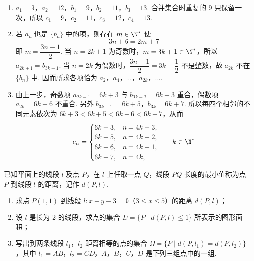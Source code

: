 \begin{solution}
\begin{enumerate}
\item \(a_1=9\)，\(a_2=12\)，\(b_1=9\)，\(b_2=11\)，\(b_3=13\). 合并集合时重复的 \(9\) 只保留一次，所以 \(c_1=9\)，\(c_2=11\)，\(c_3=12\)，\(c_4=13\).
\item 若 \(a_n\) 也是 \(\{b_n\}\) 中的项，则存在 \(m\in\N^*\) 使
\[
3n+6=2m+7
\]
即 \(m=\dfrac{3n-1}{2}\). 当 \(n=2k+1\) 为奇数时，\(m=3k+1\in\N^*\)，所以 \(a_{2k+1}=b_{3k+1}\). 当 \(n=2k\) 为偶数时，\(\dfrac{3n-1}{2}=3k-\dfrac12\) 不是整数，故 \(a_{2k}\) 不在 \(\{b_n\}\) 中. 因而所求各项恰为 \(a_2\)，\(a_4\)，\(\ldots\)，\(a_{2k}\)，\(\ldots\).
\item 由上一步，奇数项 \(a_{2k-1}=6k+3\) 与 \(b_{3k-2}=6k+3\) 重合，偶数项 \(a_{2k}=6k+6\) 不重合. 另外
\(b_{3k-1}=6k+5\)，\(b_{3k}=6k+7\).
所以每四个相邻的不同元素依次为 \(6k+3<6k+5<6k+6<6k+7\)，从而
\[
c_n=\begin{cases}
6k+3,&n=4k-3,\\
6k+5,&n=4k-2,\\
6k+6,&n=4k-1,\\
6k+7,&n=4k,
\end{cases}\qquad k\in\N^*
\]
\end{enumerate}
\end{solution}

\begin{problem}
已知平面上的线段 \(l\) 及点 \(P\)，在 \(l\) 上任取一点 \(Q\)，线段 \(PQ\) 长度的最小值称为点 \(P\) 到线段 \(l\) 的距离，记作 \(d(P, l)\).

\begin{enumerate}
\item 求点 \(P(1,1)\) 到线段 \(l: x - y - 3 = 0\)（\(3 \leqslant x \leqslant 5\)）的距离 \(d(P, l)\)；
\item 设 \(l\) 是长为 2 的线段，求点的集合 \(D = \{P \mid d(P, l) \leqslant 1\}\) 所表示的图形面积；
\item 写出到两条线段 \(l_1\)，\(l_2\) 距离相等的点的集合 \(\Omega = \{P \mid d(P, l_1) = d(P, l_2)\}\)，其中 \(l_1 = AB\)，\(l_2 = CD\)，\(A\)，\(B\)，\(C\)，\(D\) 是下列三组点中的一组.

\end{enumerate}
\end{problem}

